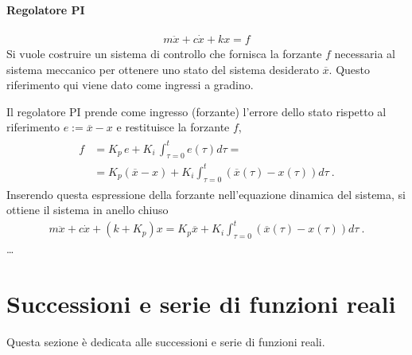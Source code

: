 \documentclass[letterpaper,10pt,italian]{jupyterBook}
\begin{document}
\subsubsection*{Regolatore PI}
\begin{equation*}
\begin{split}m \ddot{x} + c \dot{x} + k x = f\end{split}
\end{equation*}
\sphinxAtStartPar
Si vuole costruire un sistema di controllo che fornisca la forzante \(f\) necessaria al sistema meccanico per ottenere uno stato del sistema desiderato \(\overline{x}\). Questo riferimento qui viene dato come ingressi a gradino.

\sphinxAtStartPar
Il regolatore PI prende come ingresso (forzante) l’errore dello stato rispetto al riferimento \(e := \overline{x} - x\) e restituisce la forzante \(f\),
\begin{equation*}
\begin{split}\begin{aligned}
  f & = K_p \, e + K_i \, \int_{\tau=0}^{t} e(\tau)d \tau = \\
    & = K_p ( \overline{x} - x ) + K_i \int_{\tau=0}^{t} \left( \overline{x}(\tau) - x(\tau) \right) d \tau \ .
\end{aligned}\end{split}
\end{equation*}
\sphinxAtStartPar
Inserendo questa espressione della forzante nell’equazione dinamica del sistema, si ottiene il sistema in anello chiuso
\begin{equation*}
\begin{split}m \ddot{x} + c \dot{x} + \left( k + K_p \right) x = K_p \overline{x} + K_i \int_{\tau=0}^{t} \left( \overline{x}(\tau) - x(\tau) \right) d \tau \ .\end{split}
\end{equation*}
\sphinxAtStartPar
…

\sphinxAtStartPar
{} 

\sphinxstepscope


\chapter{Successioni e serie di funzioni reali}
\label{\detokenize{ch/series/series-functions-real:successioni-e-serie-di-funzioni-reali}}\label{\detokenize{ch/series/series-functions-real:math-hs-series-functions-real}}\label{\detokenize{ch/series/series-functions-real::doc}}
\sphinxAtStartPar
Questa sezione è dedicata alle successioni e serie di funzioni reali.
\end{document}
